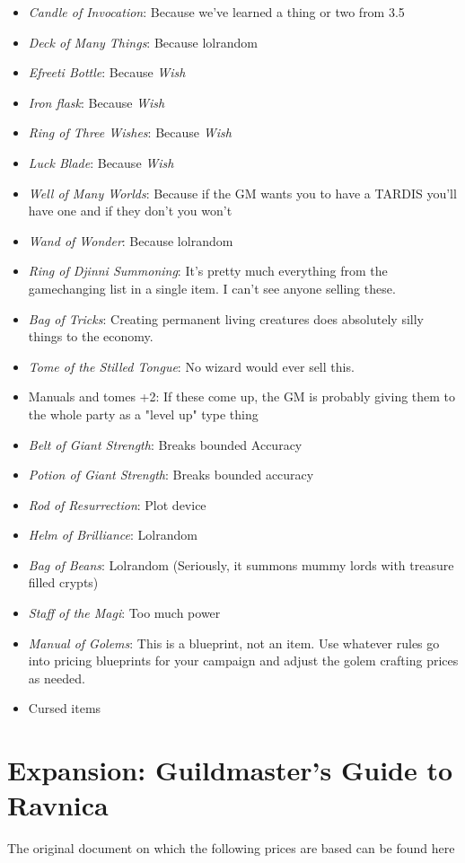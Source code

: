\documentclass[10pt,a4paper,twoside,bg=print,openany,nodeprecatedcode]{dndbook}
\begin{document}
\begin{itemize}
\item \textit{Candle of Invocation}: Because we've learned a thing or two from 3.5
\item \textit{Deck of Many Things}: Because lolrandom
\item \textit{Efreeti Bottle}: Because \textit{Wish}
\item \textit{Iron flask}: Because \textit{Wish}
\item \textit{Ring of Three Wishes}: Because \textit{Wish}
\item \textit{Luck Blade}: Because \textit{Wish}
\item \textit{Well of Many Worlds}: Because if the GM wants you to have a TARDIS you'll have one and if they don't you won't
\item \textit{Wand of Wonder}: Because lolrandom
\item \textit{Ring of Djinni Summoning}: It's pretty much everything from the gamechanging list in a single item. I can't see anyone selling these.
\item \textit{Bag of Tricks}: Creating permanent living creatures does absolutely silly things to the economy.
\item \textit{Tome of the Stilled Tongue}: No wizard would ever sell this.
\item Manuals and tomes +2: If these come up, the GM is probably giving them to the whole party as a "level up" type thing
\item \textit{Belt of Giant Strength}: Breaks bounded Accuracy
\item \textit{Potion of Giant Strength}: Breaks bounded accuracy
\item \textit{Rod of Resurrection}: Plot device
\item \textit{Helm of Brilliance}: Lolrandom
\item \textit{Bag of Beans}: Lolrandom (Seriously, it summons mummy lords with treasure filled crypts)
\item \textit{Staff of the Magi}: Too much power
\item \textit{Manual of Golems}: This is a blueprint, not an item. Use whatever rules go into pricing blueprints for your campaign and adjust the golem crafting prices as needed.
\item Cursed items
\end{itemize}

\section{Expansion: Guildmaster's Guide to Ravnica}
The original document on which the following prices are based can be found here
\end{document}
